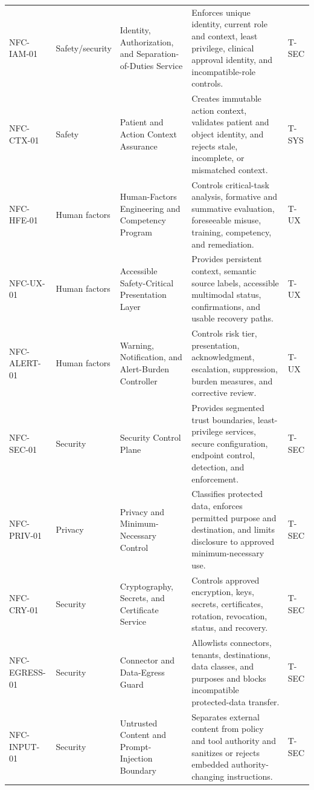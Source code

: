 \documentclass[11pt,letterpaper]{article}
\begin{document}
\begin{scriptsize}
\begin{longtable}{@{}L{0.15\textwidth}L{0.11\textwidth}L{0.21\textwidth}L{0.38\textwidth}L{0.08\textwidth}@{}}
\addlinespace[2pt]
\mbox{NFC-IAM-01} & Safety\slash\allowbreak{}security & Identity, Authorization, and Separation-of-Duties Service & Enforces unique identity, current role and context, least privilege, clinical approval identity, and incompatible-role controls. & T-SEC \\
\addlinespace[2pt]
\mbox{NFC-CTX-01} & Safety & Patient and Action Context Assurance & Creates immutable action context, validates patient and object identity, and rejects stale, incomplete, or mismatched context. & T-SYS \\
\addlinespace[2pt]
\mbox{NFC-HFE-01} & Human factors & Human-Factors Engineering and Competency Program & Controls critical-task analysis, formative and summative evaluation, foreseeable misuse, training, competency, and remediation. & T-UX \\
\addlinespace[2pt]
\mbox{NFC-UX-01} & Human factors & Accessible Safety-Critical Presentation Layer & Provides persistent context, semantic source labels, accessible multimodal status, confirmations, and usable recovery paths. & T-UX \\
\addlinespace[2pt]
\mbox{NFC-ALERT-01} & Human factors & Warning, Notification, and Alert-Burden Controller & Controls risk tier, presentation, acknowledgment, escalation, suppression, burden measures, and corrective review. & T-UX \\
\addlinespace[2pt]
\mbox{NFC-SEC-01} & Security & Security Control Plane & Provides segmented trust boundaries, least-privilege services, secure configuration, endpoint control, detection, and enforcement. & T-SEC \\
\addlinespace[2pt]
\mbox{NFC-PRIV-01} & Privacy & Privacy and Minimum-Necessary Control & Classifies protected data, enforces permitted purpose and destination, and limits disclosure to approved minimum-necessary use. & T-SEC \\
\addlinespace[2pt]
\mbox{NFC-CRY-01} & Security & Cryptography, Secrets, and Certificate Service & Controls approved encryption, keys, secrets, certificates, rotation, revocation, status, and recovery. & T-SEC \\
\addlinespace[2pt]
\mbox{NFC-EGRESS-01} & Security & Connector and Data-Egress Guard & Allowlists connectors, tenants, destinations, data classes, and purposes and blocks incompatible protected-data transfer. & T-SEC \\
\addlinespace[2pt]
\mbox{NFC-INPUT-01} & Security & Untrusted Content and Prompt-Injection Boundary & Separates external content from policy and tool authority and sanitizes or rejects embedded authority-changing instructions. & T-SEC \\

\end{longtable}
\end{scriptsize}
\end{document}
